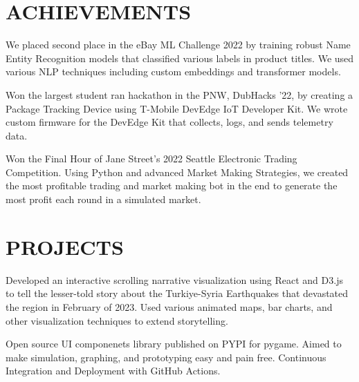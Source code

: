 \documentclass[]{main}
\begin{document}
\begin{minipage}[t]{0.66\textwidth}

\section{ACHIEVEMENTS}


We placed second place in the eBay ML Challenge 2022 by training robust Name Entity Recognition models that classified various labels in product titles. We used various NLP techniques including custom embeddings and transformer models.
\sectionsep


Won the largest student ran hackathon in the PNW, DubHacks '22, by creating a Package Tracking Device using T-Mobile DevEdge IoT Developer Kit. We wrote custom firmware for the DevEdge Kit that collects, logs, and sends telemetry data.
\sectionsep


Won the Final Hour of Jane Street's 2022 Seattle Electronic Trading Competition. Using Python and advanced Market Making Strategies, we created the most profitable trading and market making bot in the end to generate the most profit each round in a simulated market.
\sectionsep



\section{PROJECTS}


Developed an interactive scrolling narrative visualization using React and D3.js to tell
the lesser-told story about the Turkiye-Syria Earthquakes that devastated the region in 
February of 2023. Used various animated maps, bar charts, and other visualization techniques to extend storytelling.
\sectionsep

Open source UI componenets library published on PYPI for pygame. Aimed to make simulation, graphing, and prototyping easy and pain free. Continuous Integration and Deployment with GitHub Actions. 
\sectionsep



\end{minipage}
\end{document}
